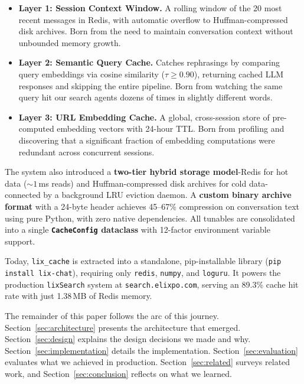 \documentclass[conference]{IEEEtran}
\begin{document}
\begin{itemize}
\item \textbf{Layer 1: Session Context Window.} A rolling window of the 20 most recent messages in Redis, with automatic overflow to Huffman-compressed disk archives. Born from the need to maintain conversation context without unbounded memory growth.
\item \textbf{Layer 2: Semantic Query Cache.} Catches rephrasings by comparing query embeddings via cosine similarity ($\tau \geq 0.90$), returning cached LLM responses and skipping the entire pipeline. Born from watching the same query hit our search agents dozens of times in slightly different words.
\item \textbf{Layer 3: URL Embedding Cache.} A global, cross-session store of pre-computed embedding vectors with 24-hour TTL. Born from profiling and discovering that a significant fraction of embedding computations were redundant across concurrent sessions.
\end{itemize}

The system also introduced a \textbf{two-tier hybrid storage model}-Redis for hot data (${\sim}1$\,ms reads) and Huffman-compressed disk archives for cold data-connected by a background LRU eviction daemon. A \textbf{custom binary archive format} with a 24-byte header achieves 45--67\% compression on conversation text using pure Python, with zero native dependencies. All tunables are consolidated into a single \textbf{\texttt{CacheConfig} dataclass} with 12-factor environment variable support.

Today, \texttt{lix\_cache} is extracted into a standalone, pip-installable library (\texttt{pip install lix-chat}), requiring only \texttt{redis}, \texttt{numpy}, and \texttt{loguru}. It powers the production \texttt{lixSearch} system at \texttt{search.elixpo.com}, serving an 89.3\% cache hit rate with just 1.38\,MB of Redis memory.

The remainder of this paper follows the arc of this journey. Section~\ref{sec:architecture} presents the architecture that emerged. Section~\ref{sec:design} explains the design decisions we made and why. Section~\ref{sec:implementation} details the implementation. Section~\ref{sec:evaluation} evaluates what we achieved in production. Section~\ref{sec:related} surveys related work, and Section~\ref{sec:conclusion} reflects on what we learned.

\end{document}
